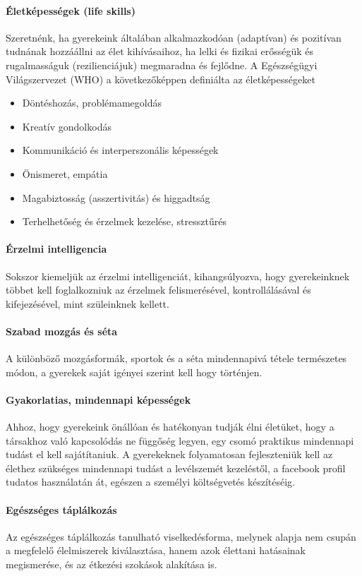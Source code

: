\paragraph{Életképességek (life skills)}

Szeretnénk, ha gyerekeink általában alkalmazkodóan (adaptívan) és pozitívan
tudnának hozzáállni az élet kihívásaihoz, ha lelki és fizikai erősségük és
rugalmasságuk (rezilienciájuk) megmaradna és fejlődne.	 A Egészségügyi
Világszervezet (WHO) a következőképpen definiálta \citep{oecd99lifeskills} az
életképességeket
\begin{itemize}
  \item Döntéshozás, problémamegoldás

  \item Kreatív gondolkodás

  \item Kommunikáció és interperszonális képességek

  \item Önismeret, empátia

  \item Magabiztosság (asszertivitás) és higgadtság

  \item Terhelhetőség és érzelmek kezelése, stressztűrés
\end{itemize}
\paragraph{Érzelmi intelligencia}

Sokszor kiemeljük az érzelmi intelligenciát, kihangsúlyozva, hogy gyerekeinknek
többet kell foglalkozniuk az érzelmek felismerésével, kontrollálásával és
kifejezésével, mint szüleinknek kellett.

\paragraph{Szabad mozgás és séta}

A különböző mozgásformák, sportok és a séta mindennapivá tétele természetes
módon, a gyerekek saját igényei szerint kell hogy történjen.

\paragraph{Gyakorlatias, mindennapi képességek}

Ahhoz, hogy gyerekeink önállóan és hatékonyan tudják élni életüket, hogy a
társakhoz való kapcsolódás ne függőség legyen, egy csomó praktikus mindennapi
tudást el kell sajátítaniuk. A gyerekeknek folyamatosan fejleszteniük kell az
élethez szükséges mindennapi tudást a levélszemét kezeléstől, a facebook profil
tudatos használatán át, egészen a személyi költségvetés készítéséig.

\paragraph{Egészséges táplálkozás}

Az egészséges táplálkozás tanulható viselkedésforma, melynek alapja nem csupán
a megfelelő élelmiszerek kiválasztása, hanem azok élettani hatásainak
megismerése, és az étkezési szokások alakítása is.


